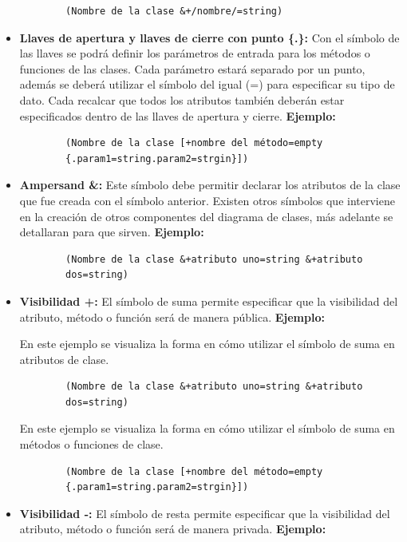 \begin{itemize}
	\begin{verbatim}
		(Nombre de la clase &+/nombre/=string)
	\end{verbatim} 
	
	\item \textbf{Llaves de apertura y llaves de cierre con punto \{.\}:} Con el símbolo de las llaves se podrá definir los parámetros de entrada para los métodos o funciones de las clases. Cada parámetro estará separado por un punto, además se deberá utilizar el símbolo del igual (=) para especificar su tipo de dato. Cada recalcar que todos los atributos también deberán estar especificados dentro de las llaves de apertura y cierre. \textbf{Ejemplo:}
	
	\begin{verbatim}
		(Nombre de la clase [+nombre del método=empty
		{.param1=string.param2=strgin}])
	\end{verbatim}
	
	\item \textbf{Ampersand \&: } Este símbolo debe permitir declarar los atributos de la clase que fue creada con el símbolo anterior. Existen otros símbolos que interviene en la creación de otros componentes del diagrama de clases, más adelante se detallaran para que sirven. \textbf{Ejemplo:}
	
	\begin{verbatim}
		(Nombre de la clase &+atributo uno=string &+atributo 
		dos=string)
	\end{verbatim}
	
	\item \textbf{Visibilidad +: } El símbolo de suma permite especificar que la visibilidad del atributo, método o función será de manera pública. \textbf{Ejemplo:}
	
	En este ejemplo se visualiza la forma en cómo utilizar el símbolo de suma en atributos de clase.
	
	\begin{verbatim}
		(Nombre de la clase &+atributo uno=string &+atributo 
		dos=string)
	\end{verbatim}
	
	En este ejemplo se visualiza la forma en cómo utilizar el símbolo de suma en métodos o funciones de clase.
	
	\begin{verbatim}
		(Nombre de la clase [+nombre del método=empty
		{.param1=string.param2=strgin}])
	\end{verbatim}
	
	\item \textbf{Visibilidad -: } El símbolo de resta permite especificar que la visibilidad del atributo, método o función será de manera privada. \textbf{Ejemplo:}
	

\end{itemize}
